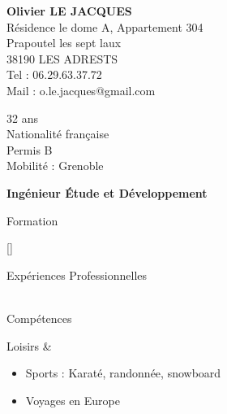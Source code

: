 \documentclass{cv}
\newlength{\espaceChamps}
\newcommand{\educationdir}{french/education}
\newcommand{\experiencedir}{french/experience}
\newcommand{\skilldir}{french/skill}
\newlength{\firstcolumnwidth}%
\begin{document}
\begin{chapeau}
	\begin{adresse}
		\textbf{Olivier LE JACQUES}\\
		Résidence le dome A, Appartement 304\\
		Prapoutel les sept laux\\
		38190 LES ADRESTS\\
		Tel : 06.29.63.37.72\\
		Mail : o.le.jacques@gmail.com\\
	\end{adresse}
	\begin{etatcivil}
		32 ans \\
        Nationalité française \\
		Permis B \\
        Mobilité : Grenoble \\
	\end{etatcivil}
\end{chapeau}

\vspace{0.2cm}

\begin{center}
	\textbf{\huge{Ingénieur Étude et Développement}}
\end{center}

\vspace{0.2cm}

\begin{rubriquetableau}[\firstcolumnwidth]{Formation}
    
    
    
    
    
    [\espaceChamps] \\
\end{rubriquetableau}

\begin{rubriquetableau}[\firstcolumnwidth]{Expériences Professionnelles}
     \\
	 \\
\end{rubriquetableau}

\newpage

\begin{rubriquetableau}[\firstcolumnwidth]{Compétences}
    
	
	
\end{rubriquetableau}
    
\begin{rubriquetableau}[\firstcolumnwidth]{Loisirs}
	& \begin{itemize}
		\item Sports : Karaté, randonnée, snowboard
        \item Voyages en Europe
	\end{itemize}\\
\end{rubriquetableau}
\end{document}

